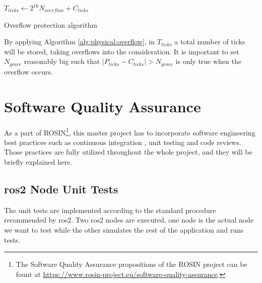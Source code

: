 \vspace*{.4cm}
\begin{algorithm}[H]

$ T_{ticks} \leftarrow 2^{16} N_{overflow} + C_{ticks} $\;

\caption{Overflow protection algorithm}
\label{alg:physical:overflow}
\end{algorithm}
\vspace*{.4cm}

By applying Algorithm \ref{alg:physical:overflow}, in $ T_{ticks} $ a total number of ticks will be stored, taking overflows into the consideration. It is important to set $ N_{grace} $ reasonably big such that $ |P_{ticks} - C_{ticks}| > N_{grace} $ is only true when the overflow occurs.

\section{Software Quality Assurance}
As a part of ROSIN\footnote{The Software Quality Assurance propositions of the ROSIN project can be fount at \url{https://www.rosin-project.eu/software-quality-assurance}.}, this master project has to incorporate software engineering best practices such as continuous integration \cite{meyer_continuous_2014}, unit testing and code reviews. Those practices are fully utilized throughout the whole project, and they will be briefly explained here.

\subsection{\ac{ros2} Node Unit Tests}

The unit tests are implemented according to the standard procedure recommended by \ac{ros2}.
Two \ac{ros2} nodes are executed, one node is the actual node we want to test while the other simulates the rest of the application and runs tests. 

